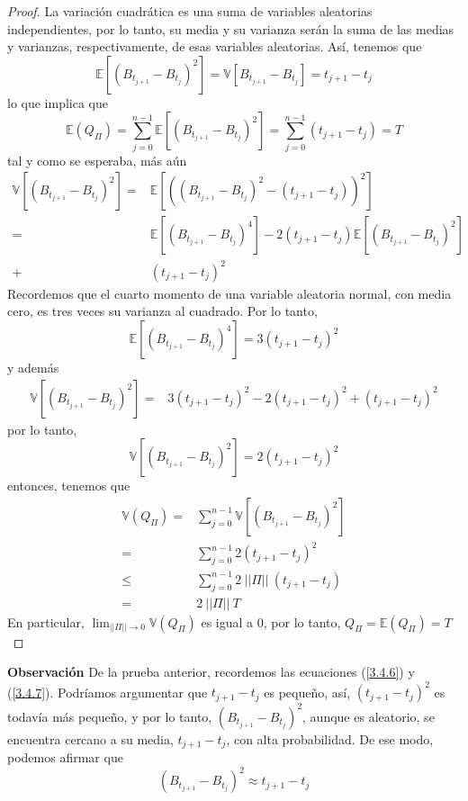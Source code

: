 \documentclass[11pt,notitlepage]{article}
\begin{document}
\begin{proof}
La variación cuadrática es una suma de variables aleatorias independientes, por lo tanto, su media y su varianza serán la suma de las medias y varianzas, respectivamente, de esas variables aleatorias. Así, tenemos que
\begin{equation} \label{3.4.6}
    \mathbb{E}\left[\left(B_{t_{j+1}}-B_{t_j}\right)^2\right]= \mathbb{V}\left[B_{t_{j+1}}-B_{t_j}\right]= t_{j+1}-t_j
\end{equation}
lo que implica que
\begin{equation*}
    \mathbb{E}(Q_\Pi)=\sum_{j=0}^{n-1}\mathbb{E}\left[(B_{t_{j+1}}-B_{t_j})^2\right]=\sum_{j=0}^{n-1}(t_{j+1}-t_j)=T
\end{equation*}
tal y como se esperaba, más aún
\begin{align*}
    \mathbb{V}\left[(B_{t_{j+1}}-B_{t_j})^2\right]=&\mathbb{E}\left[\left((B_{t_{j+1}}-B_{t_j})^2-(t_{j+1}-t_j)\right)^2\right]\\
    =& \mathbb{E}\left[(B_{t_{j+1}}-B_{t_j})^4\right]-2(t_{j+1}-t_j)\mathbb{E}\left[(B_{t_{j+1}}-B_{t_j})^2\right]\\+&(t_{j+1}-t_j)^2
\end{align*}
Recordemos que el cuarto momento de una variable aleatoria normal, con media cero, es tres veces su varianza al cuadrado. Por lo tanto,
\[\mathbb{E}\left[(B_{t_{j+1}}-B_{t_j})^4\right]=3(t_{j+1}-t_j)^2\]
y además
\begin{align*}
    \mathbb{V}\left[(B_{t_{j+1}}-B_{t_j})^2\right]= & 3(t_{j+1}-t_j)^2-2(t_{j+1}-t_j)^2+(t_{j+1}-t_j)^2
\end{align*}
por lo tanto, 
\begin{equation} \label{3.4.7}
     \mathbb{V}\left[(B_{t_{j+1}}-B_{t_j})^2\right]=2(t_{j+1}-t_j)^2
\end{equation}
entonces, tenemos que 
\begin{align*}
    \mathbb{V}(Q_\Pi)=&\sum_{j=0}^{n-1}\mathbb{V}\left[(B_{t_{j+1}}-B_{t_j})^2\right]\\
    =& \sum_{j=0}^{n-1}2 (t_{j+1}-t_j)^2\\
    \leq & \sum_{j=0}^{n-1} 2~||\Pi||~(t_{j+1}-t_j)\\
    =&2~||\Pi||~T
\end{align*}
En particular, \(\lim_{||\Pi|| \to 0} \mathbb{V}(Q_\Pi)\) es igual a \(0\), por lo tanto, \(Q_{\Pi}=\mathbb{E}(Q_{\Pi})=T\)
\end{proof}

\textbf{Observación} De la prueba anterior, recordemos las ecuaciones (\ref{3.4.6}) y (\ref{3.4.7}). Podríamos argumentar que \(t_{j+1}-t_j\) es pequeño, así, \((t_{j+1}-t_j)^2\) es todavía más pequeño, y por lo tanto, \((B_{t_{j+1}}-B_{t_j})^2\), aunque es aleatorio, se encuentra cercano a su media, \(t_{j+1}-t_j\), con alta probabilidad. De ese modo, podemos afirmar que 
\begin{equation} \label{3.4.8}
   (B_{t_{j+1}}-B_{t_j})^2 \approx t_{j+1}-t_j 
\end{equation}
\end{document}
